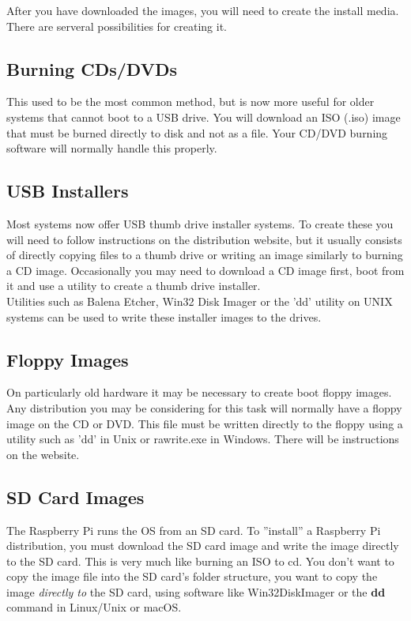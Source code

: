 After you have downloaded the images, you will need to create the install media.  There are serveral possibilities for creating it.

\subsection{Burning CDs/DVDs}

This used to be the most common method, but is now more useful for older systems that cannot boot to a USB drive.  You will download an ISO (.iso) image that must be burned directly to disk and not as a file.  Your CD/DVD burning software will normally handle this properly.

\subsection{USB Installers}

Most systems now offer USB thumb drive installer systems.  To create these you will need to follow instructions on the distribution website, but it usually consists of directly copying files to a thumb drive or writing an image similarly to burning a CD image.  Occasionally you may need to download a CD image first, boot from it and use a utility to create a thumb drive installer.\\

Utilities such as Balena Etcher, Win32 Disk Imager or the 'dd' utility on UNIX systems can be used to write these installer images to the drives.


\subsection{Floppy Images}

On particularly old hardware it may be necessary to create boot floppy images.  Any distribution you may be considering for this task will normally have a floppy image on the CD or DVD.  This file must be written directly to the floppy using a utility such as 'dd' in Unix or rawrite.exe in Windows.  There will be instructions on the website.

\subsection{SD Card Images}

The Raspberry Pi runs the OS from an SD card.  To ''install'' a Raspberry Pi distribution, you must download the SD card image and write the image directly to the SD card.  This is very much like burning an ISO to cd.  You don't want to copy the image file into the SD card's folder structure, you want to copy the image \textit{directly to} the SD card, using software like Win32DiskImager or the \textbf{dd} command in Linux/Unix or macOS.\\


